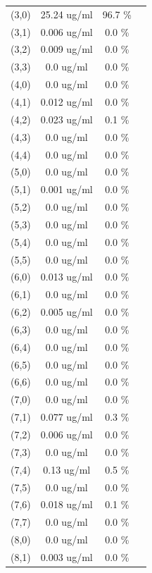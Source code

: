 \documentclass{article}
\begin{document}
\begin{tabular}{c c c c}
(3,0)&        25.24 ug/ml        &96.7 \%\\
(3,1)&        0.006 ug/ml        &0.0 \%\\
(3,2)&        0.009 ug/ml        &0.0 \%\\
(3,3)&        0.0 ug/ml        &0.0 \%\\
(4,0)&        0.0 ug/ml        &0.0 \%\\
(4,1)&        0.012 ug/ml        &0.0 \%\\
(4,2)&        0.023 ug/ml        &0.1 \%\\
(4,3)&        0.0 ug/ml        &0.0 \%\\
(4,4)&        0.0 ug/ml        &0.0 \%\\
(5,0)&        0.0 ug/ml        &0.0 \%\\
(5,1)&        0.001 ug/ml        &0.0 \%\\
(5,2)&        0.0 ug/ml        &0.0 \%\\
(5,3)&        0.0 ug/ml        &0.0 \%\\
(5,4)&        0.0 ug/ml        &0.0 \%\\
(5,5)&        0.0 ug/ml        &0.0 \%\\
(6,0)&        0.013 ug/ml        &0.0 \%\\
(6,1)&        0.0 ug/ml        &0.0 \%\\
(6,2)&        0.005 ug/ml        &0.0 \%\\
(6,3)&        0.0 ug/ml        &0.0 \%\\
(6,4)&        0.0 ug/ml        &0.0 \%\\
(6,5)&        0.0 ug/ml        &0.0 \%\\
(6,6)&        0.0 ug/ml        &0.0 \%\\
(7,0)&        0.0 ug/ml        &0.0 \%\\
(7,1)&        0.077 ug/ml        &0.3 \%\\
(7,2)&        0.006 ug/ml        &0.0 \%\\
(7,3)&        0.0 ug/ml        &0.0 \%\\
(7,4)&        0.13 ug/ml        &0.5 \%\\
(7,5)&        0.0 ug/ml        &0.0 \%\\
(7,6)&        0.018 ug/ml        &0.1 \%\\
(7,7)&        0.0 ug/ml        &0.0 \%\\
(8,0)&        0.0 ug/ml        &0.0 \%\\
(8,1)&        0.003 ug/ml        &0.0 \%\\

\end{tabular}
\end{document}
